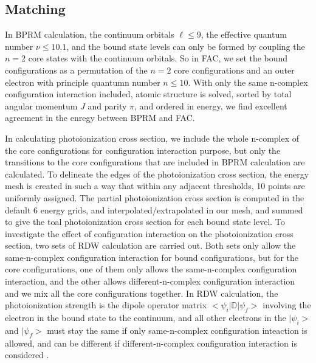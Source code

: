 \subsection{Matching} \label{section_matching}
In BPRM calculation, the continuum orbitals $\ell\leq9$, the effective quantum number $\nu\leq10.1$, and the bound state levels can only be formed by coupling the $n=2$ core states with the continuum orbitals. So in FAC, we set the bound configurations as a permutation of the $n=2$ core configurations and an outer electron with principle quantumn number $n\leq10$. With only the same n-complex configuration interaction included, atomic structure is solved, sorted by total angular momentum $J$ and parity $\pi$, and ordered in energy, we find excellent agreement in the enregy between BPRM and FAC.

In calculating photoionization cross section, we include the whole n-complex of the core configurations for configuration interaction purpose, but only the transitions to the core configurations that are included in BPRM calculation are calculated. To delineate the edges of the photoionization cross section, the energy mesh is created in such a way that within any adjacent thresholds, 10 points are uniformly assigned. The partial photoionization cross section is computed in the default 6 energy grids, and interpolated/extrapolated in our mesh, and summed to give the toal photoionization cross section for each bound state level. To investigate the effect of configuration interaction on the photoionization cross section, two sets of RDW calculation are carried out. Both sets only allow the same-n-complex configuration interaction for bound configurations, but for the core configurations, one of them only allows the same-n-complex configuration interaction, and the other allows different-n-complex configuration interaction and we mix all the core configurations together. In RDW calculation, the photoionization strength is the dipole operator matrix $<\psi_i|\mathbb{D}|\psi_f>$ involving the electron in the bound state to the continuum, and all other electrons in the $|\psi_i>$ and $|\psi_f>$ must stay the same if only same-n-complex configuration inteaction is allowed, and can be different if different-n-complex configuration interaction is considered \citep{gu_email}.

